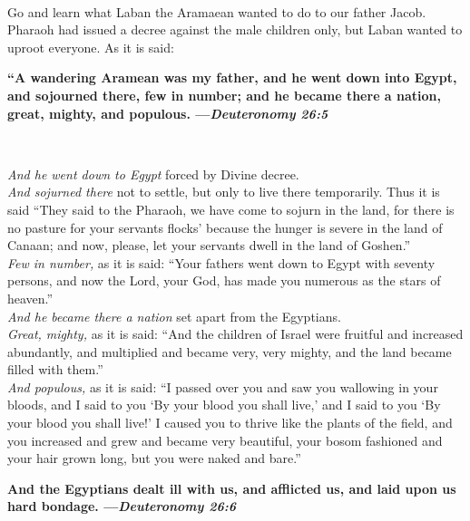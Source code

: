 \documentclass[letter,11pt,openany]{memoir}
\newcommand{\HgInst}[1]{{\noindent\sffamily{\bfseries{#1}}}}
\newcommand{\HgSource}[1]{\hfill{\small---\itshape{#1}}}
\newcommand{\HgHL}[1]{{\Large\textbf{#1}\par\noindent\\[-.5em]}}
\newenvironment{HgEnglish}{\strut\\\noindent}{\vspace{1em}}
\begin{document}

\vspace{-2em}
\begin{HgEnglish}
Go and learn what Laban the Aramaean wanted to do to our father Jacob. Pharaoh
had issued a decree against the male children only, but Laban wanted to uproot
everyone. As it is said: 
\end{HgEnglish}

\noindent
\HgHL{%
  ``A wandering Aramean was my father, and he went
  down into Egypt, and sojourned there, few in number; and he became there a
  nation, great, mighty, and populous.
  \HgSource{Deuteronomy 26:5}
}

\vspace{-.5em}
{
  \small
  \noindent
  {\itshape And he went down to Egypt} forced by Divine decree.\\[1em]
  {\itshape And sojurned there} not to settle, but only to live there temporarily.
  Thus it is said ``They said to the Pharaoh, we have come to sojurn in the
  land, for there is no pasture for your servants flocks' because the hunger is
  severe in the land of Canaan; and now, please, let your servants dwell in the
  land of Goshen.''\\[1em]
  {\itshape Few in number,} as it is said: ``Your fathers went down to Egypt with
  seventy persons, and now the Lord, your God, has made you numerous as the
  stars of heaven.''\\[1em]
  {\itshape And he became there a nation} set apart from the Egyptians.\\[1em]
  {\itshape Great, mighty,} as it is said: ``And the children of Israel were fruitful and
  increased abundantly, and multiplied and became very, very mighty, and the land
  became filled with them.''\\[1em]
  {\itshape And populous,} as it is said: ``I passed over you and saw you wallowing in
  your bloods, and I said to you `By your blood you shall live,' and I said to you
  `By your blood you shall live!' I caused you to thrive like the plants of the
  field, and you increased and grew and became very beautiful, your bosom
  fashioned and your hair grown long, but you were naked and bare.''\\[1em]
}

\noindent
\HgHL{%
  And the Egyptians dealt ill with us, and
  afflicted us, and laid upon us hard bondage. 
  \HgSource{Deuteronomy 26:6}
}
\end{document}
